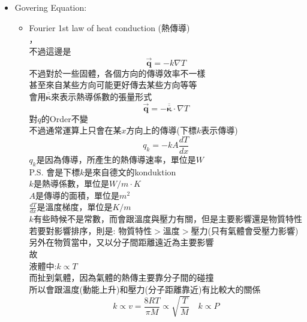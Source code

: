 \documentclass[../main.tex]{subfiles}
\begin{document}
\begin{itemize}
  \item Govering Equation:
    \begin{itemize}
      \item Fourier 1st law of heat conduction (熱傳導)\\
        ，\\
        不過這邊是
        \begin{equation}
          \vec{\bm q} = -k\nabla T
        \end{equation}
        不過對於一些固體，各個方向的傳導效率不一樣\\
        甚至來自某些方向可能更好傳去某些方向等等\\
        會用$\overline{\overline{\bm \kappa}}$來表示熱導係數的張量形式
        \begin{equation}
          \vec{\bm q} = -\overline{\overline{\bm \kappa}}\cdot \nabla T
        \end{equation}
        對$q$的Order不變\\
        不過通常運算上只會在某$x$方向上的傳導(下標$k$表示傳導)
        \begin{equation}
          q_k=-kA\frac{dT}{dx}
        \end{equation}
        $q_k$是因為傳導，所產生的熱傳導速率，單位是$W$\\
        P.S. 會是下標$k$是來自德文的konduktion\\
        $k$是熱導係數，單位是$W/m\cdot K$\\
        $A$是傳導的面積，單位是$m^2$\\
        $\frac{dT}{dx}$是溫度梯度，單位是$K/m$\\
        $k$有些時候不是常數，而會跟溫度與壓力有關，但是主要影響還是物質特性\\
        若要對影響排序，則是: 物質特性$>$溫度$>$壓力(只有氣體會受壓力影響)\\
        另外在物質當中，又以分子間距離遠近為主要影響\\
        故\\
        液體中:$k\propto T$\\
        而扯到氣體，因為氣體的熱傳主要靠分子間的碰撞\\
        所以會跟溫度(動能上升)和壓力(分子距離靠近)有比較大的關係
        \begin{equation}
          k\propto v = \frac{8RT}{\pi M} \propto \sqrt{\frac{T}{M}} \quad k\propto P

\end{equation}
\end{itemize}
\end{itemize}
\end{document}

